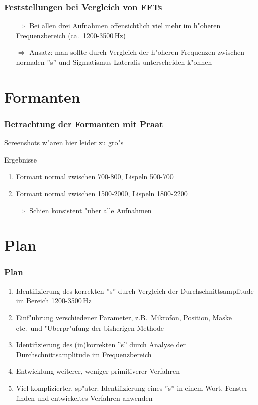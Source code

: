 \documentclass[11pt]{beamer}
\begin{document}
\begin{frame}
\frametitle{Feststellungen bei Vergleich von FFTs}
\begin{itemize}
\item[$\Rightarrow$] Bei allen drei Aufnahmen offensichtlich viel mehr im h"oheren Frequenzbereich (ca.\ 1200-3500\,Hz)
\item[$\Rightarrow$] Ansatz: man sollte durch Vergleich der h"oheren Frequenzen zwischen normalen ''s'' und Sigmatismus Lateralis unterscheiden k"onnen
\end{itemize}
\end{frame}

\section{Formanten}

\begin{frame}
\frametitle{Betrachtung der Formanten mit Praat}
Screenshots w"aren hier leider zu gro"s
\begin{block}{Ergebnisse}
\begin{enumerate}
\item Formant normal zwischen 700-800, Lispeln 500-700
\item Formant normal zwischen 1500-2000, Lispeln 1800-2200
\item[$\Rightarrow$] Schien konsistent "uber alle Aufnahmen
\end{enumerate}
\end{block}
\end{frame}

\section{Plan}

\begin{frame}
	\frametitle{Plan}
	\begin{enumerate}
		\item Identifizierung des korrekten ''s'' durch Vergleich der Durchschnittsamplitude im Bereich 1200-3500\,Hz
		\item Einf"uhrung verschiedener Parameter, z.B.\ Mikrofon, Position, Maske etc.\ und "Uberpr"ufung der bisherigen Methode
		\item Identifizierung des (in)korrekten ''s'' durch Analyse der Durchschnittsamplitude im Frequenzbereich
		\item Entwicklung weiterer, weniger primitiverer Verfahren
		\item Viel komplizierter, sp"ater: Identifizierung eines ''s'' in einem Wort, Fenster finden und entwickeltes Verfahren anwenden
	\end{enumerate}
\end{frame}
\end{document}
